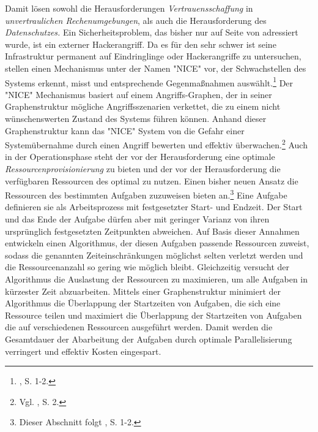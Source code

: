 Damit lösen \cite{Zhang.2012} sowohl die Herausforderungen \emph{Vertrauensschaffung} in \emph{unvertraulichen Rechenumgebungen}, als auch die Herausforderung des \emph{Datenschutzes.}
\newline
Ein Sicherheitsproblem, das bisher nur auf Seite \pageref{id:61} von \cite{Suciu.2012} adressiert wurde, ist ein externer Hackerangriff. Da es für den \CSP sehr schwer ist seine \CC Infrastruktur permanent auf Eindringlinge oder Hackerangriffe zu untersuchen, stellen \cite{Chung.2013} einen Mechanismus unter der Namen "NICE" vor, der Schwachstellen des \CC Systems erkennt, misst und entsprechende Gegenmaßnahmen auswählt.\footnote{\cite{Chung.2013}, S. 1-2.}
Der "NICE" Mechanismus basiert auf einem Angriffs-Graphen, der in seiner Graphenstruktur mögliche Angriffsszenarien verkettet, die zu einem nicht wünschenswerten Zustand des \CC Systems führen können. Anhand dieser Graphenstruktur kann das "NICE" System von \cite{Chung.2013} die Gefahr einer Systemübernahme durch einen Angriff bewerten und effektiv überwachen.\footnote{Vgl. \cite{Chung.2013}, S. 2.}
\newline
\newline
Auch in der Operationsphase steht der \CSP vor der Herausforderung eine optimale \emph{Ressourcenprovisionierung} zu bieten und der \CSU vor der Herausforderung die verfügbaren Ressourcen des \CSs optimal zu nutzen.
Einen bisher neuen Ansatz die Ressourcen des \CSPs bestimmten Aufgaben zuzuweisen bieten \cite{Doulamis.2012} an.\footnote{Dieser Abschnitt folgt \cite{Doulamis.2012}, S. 1-2.}
Eine Aufgabe definieren sie als Arbeitsprozess mit festgesetzter Start- und Endzeit. Der Start und das Ende der Aufgabe dürfen aber mit geringer Varianz von ihren ursprünglich festgesetzten Zeitpunkten abweichen.
Auf Basis dieser Annahmen entwickeln \cite{Doulamis.2012} einen Algorithmus, der diesen Aufgaben passende Ressourcen zuweist, sodass die genannten Zeiteinschränkungen möglichst selten verletzt werden und die Ressourcenanzahl so gering wie möglich bleibt.
Gleichzeitig versucht der Algorithmus die Auslastung der Ressourcen zu maximieren, um alle Aufgaben in kürzester Zeit abzuarbeiten. 
Mittels einer Graphenstruktur minimiert der Algorithmus die Überlappung der Startzeiten von Aufgaben, die sich eine Ressource teilen und maximiert die Überlappung der Startzeiten von Aufgaben die auf verschiedenen Ressourcen ausgeführt werden.
Damit werden die Gesamtdauer der Abarbeitung der Aufgaben durch optimale Parallelisierung verringert und effektiv Kosten eingespart.
